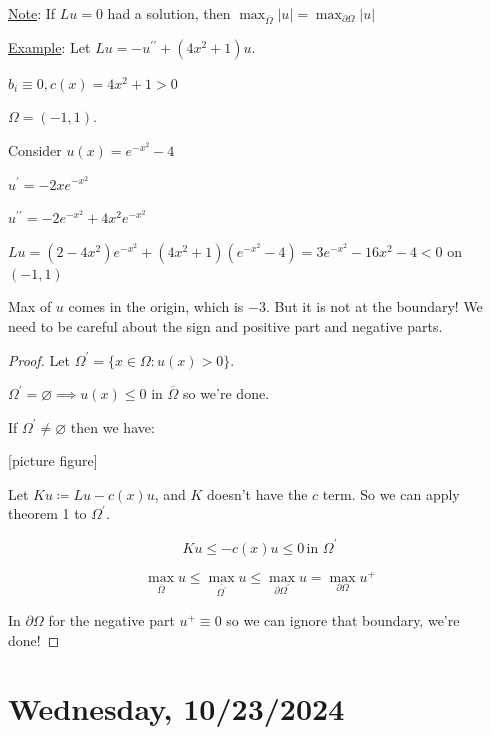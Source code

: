 \documentclass{article}
\theoremstyle{definition}
\begin{document}
\underline{Note}: If \(Lu = 0\) had a solution, then \(\max_{\overline{\Omega}} \vert u \vert = \max_{\partial \Omega} \vert u \vert \) 

\underline{Example}: Let \(Lu = - u^{\prime\prime} + (4x^2 + 1)u\).

\(b_i \equiv 0, c(x) = 4x^2 + 1 > 0\) 

\(\Omega = (-1,1)\).

Consider \(u(x) = e^{-x^2} - 4\)

\(u^{\prime} = -2x e^{-x^2}\)

\(u^{\prime\prime} = -2 e^{-x^2} + 4x^2 e^{-x^2}\) 

\(L u =(2-4x^2)e^{-x^2} + (4x^2 + 1)(e^{-x^2} - 4) = 3 e^{-x^2} - 16x^2 - 4 < 0 \) on \((-1,1)\) 

Max of \(u\) comes in the origin, which is \(-3\). But it is not at the boundary! We need to be careful about the sign and positive part and negative parts.

\begin{proof}
    Let \(\Omega ^{\prime} = \{ x\in \Omega : u(x) > 0 \}\).

    \(\Omega ^{\prime} = \varnothing \implies u(x) \leq 0\) in \(\overline{\Omega}\) so we're done.

    If \(\Omega ^{\prime} \neq \varnothing\) then we have:

    [picture figure]

    Let \(Ku \coloneqq L u - c(x)u\), and \(K\) doesn't have the \(c\) term. So we can apply theorem 1 to \(\Omega ^{\prime} \). 

    \[
        Ku \leq - c(x) u \leq 0 \, \text{in } \Omega ^{\prime} 
    \]

    \[
        \max_{\overline{\Omega}} u \leq \max_{\overline{\Omega^{\prime}}} u \leq \max_{\partial \Omega ^{\prime}} u = \max_{\partial \Omega} u^+ 
    \]

    In \(\partial \Omega\) for the negative part \(u^+ \equiv 0\) so we can ignore that boundary, we're done!

\end{proof}

\section*{Wednesday, 10/23/2024}
\end{document}
